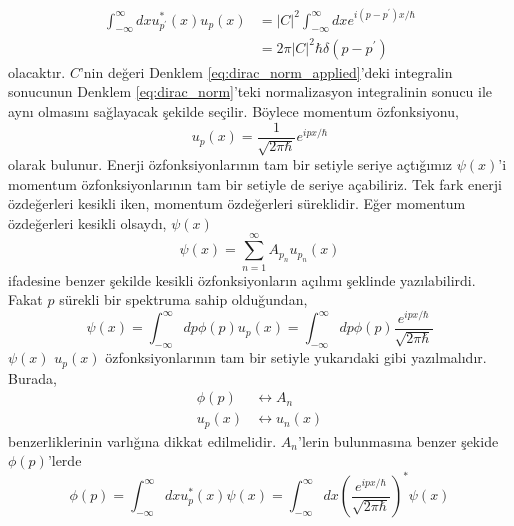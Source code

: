 \documentclass[00_kitap.tex]{subfiles}
\begin{document}
\begin{equation}
\label{eq:dirac_norm_applied}
\begin{aligned} 
\int _ { - \infty } ^ { \infty } d x u _ { p ^ { \prime } } ^ { * } ( x ) u _ { p } ( x ) 
& = | C | ^ { 2 } \int _ { - \infty } ^ { \infty } d x e ^ { i \left( p - p ^ { \prime } \right) x / \hbar } \\ 
& = 2 \pi | C | ^ { 2 } \hbar \delta \left( p - p ^ { \prime } \right) 
\end{aligned}
\end{equation}
olacaktır. $C$'nin değeri Denklem \ref{eq:dirac_norm_applied}'deki integralin sonucunun Denklem \ref{eq:dirac_norm}'teki normalizasyon integralinin sonucu ile aynı olmasını sağlayacak şekilde seçilir. Böylece momentum özfonksiyonu,
\begin{equation}
u _ { p } ( x ) = \frac { 1 } { \sqrt { 2 \pi \hbar } } e ^ { i p x / \hbar }
\end{equation}
olarak bulunur. Enerji özfonksiyonlarının tam bir setiyle seriye açtığımız $\psi(x)$'i momentum özfonksiyonlarının tam bir setiyle de seriye açabiliriz. Tek fark enerji özdeğerleri kesikli iken, momentum özdeğerleri süreklidir. Eğer momentum özdeğerleri kesikli olsaydı, $\psi(x)$
\begin{equation}
\psi ( x ) = \sum _ { n = 1 } ^ { \infty } A _ { p_n } u _ {p_ n } ( x )
\end{equation}
ifadesine benzer şekilde kesikli özfonksiyonların açılımı şeklinde yazılabilirdi. Fakat $\hat p$ sürekli bir spektruma sahip olduğundan,
\begin{equation}
\psi ( x )  
= \int _ { - \infty } ^ { \infty } d p \phi ( p ) u_p(x)
= \int _ { - \infty } ^ { \infty } d p \phi ( p ) \frac { e ^ { i p x /\hbar } } { \sqrt { 2 \pi \hbar } }
\label{eq:psi_x_complete_set_expansion}
\end{equation}
$\psi(x)$ $u_p(x)$ özfonksiyonlarının tam bir setiyle yukarıdaki gibi yazılmalıdır. Burada,
\begin{align*}
\phi(p) &\leftrightarrow A_n \\
u_p(x)  &\leftrightarrow u_n(x) 
\end{align*}
benzerliklerinin varlığına dikkat edilmelidir. $A_n$'lerin bulunmasına benzer şekide $\phi(p)$'lerde
\begin{equation}
\phi ( p )
= \int _ { - \infty } ^ { \infty } d x u^\ast_p(x)  \psi ( x )
= \int _ { - \infty } ^ { \infty } d x \left( \frac { e ^ { i p x / \hbar } } { \sqrt { 2 \pi \hbar } } \right) ^ { * } \psi ( x )
\label{eq:phi_p_complete_set_expansion}
\end{equation}
\end{document}
